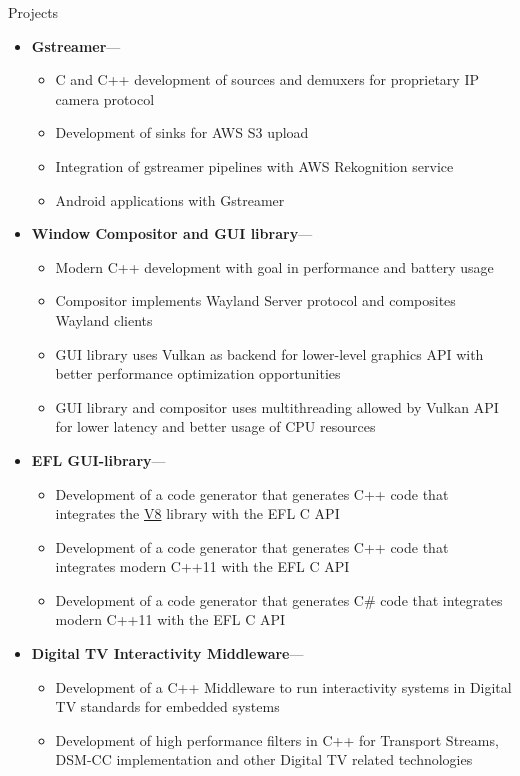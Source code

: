 \documentclass[10pt,oneside]{article}
\newenvironment{ressection}[1]{
	\vspace{4pt}
	{\fontfamily{phv}\selectfont\Large#1}
	\begin{itemize}
	\vspace{3pt}
}{
	\end{itemize}
}
\newcommand{\ressubitem}[1]{
	\vspace{-1pt}
	\item \begin{flushleft} #1 \end{flushleft}
}
\newcommand{\resonelinebigitem}[2]{
	\vspace{-5pt}
	\item
	\textbf{#1}---#2
}
\newenvironment{resonelinesubsec}[2]{
	\resonelinebigitem{#1}{#2}
	\vspace{-2pt}
	\begin{itemize}
}{
	\end{itemize}
}
\begin{document}
\newpage
\begin{ressection}{Projects}

  \begin{resonelinesubsec}{Gstreamer}{}
    \ressubitem{C and C++ development of sources and demuxers for
      proprietary IP camera protocol}
    \ressubitem{Development of sinks for AWS S3 upload}
    \ressubitem{Integration of gstreamer pipelines with AWS
      Rekognition service}
    \ressubitem{Android applications with Gstreamer}
  \end{resonelinesubsec}

  \begin{resonelinesubsec}{Window Compositor and GUI library}{}
    \ressubitem{Modern C++ development with goal in performance and
      battery usage}
    \ressubitem{Compositor implements Wayland Server protocol and
      composites Wayland clients}
    \ressubitem{GUI library uses Vulkan as backend for lower-level
      graphics API with better performance optimization opportunities}
    \ressubitem{GUI library and compositor uses multithreading allowed
      by Vulkan API for lower latency and better usage of CPU resources}
  \end{resonelinesubsec}
  
  \begin{resonelinesubsec}{EFL GUI-library}{}
    \ressubitem{Development of a code generator that generates C++
      code that integrates the
      \href{https://developers.google.com/v8/}{V8} library with the
      EFL C API}
    \ressubitem{Development of a code generator that generates C++
      code that integrates modern C++11 with the
      EFL C API}
    \ressubitem{Development of a code generator that generates C\#
      code that integrates modern C++11 with the
      EFL C API}
  \end{resonelinesubsec}


  \begin{resonelinesubsec}{Digital TV Interactivity Middleware}{}
    \ressubitem{Development of a C++ Middleware to run interactivity
      systems in Digital TV standards for embedded systems}
    \ressubitem{Development of high performance filters in C++ for
      Transport Streams, DSM-CC implementation and other Digital TV
      related technologies}
  \end{resonelinesubsec}


\end{ressection}
\end{document}
